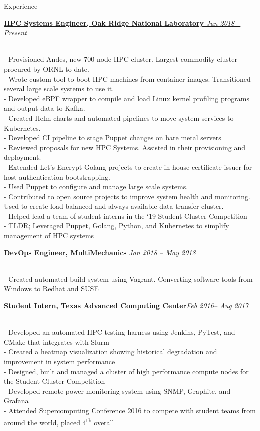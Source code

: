\documentclass{resume} %
\begin{document}
\begin{rSection}{Experience}

\href{http://olcf.ornl.gov}
{\textbf{HPC Systems Engineer, Oak Ridge National Laboratory}
  \hfill {\em Jun 2018 -- Present}}
  
\\- Provisioned Andes, new 700 node HPC cluster. Largest commodity cluster
    procured by ORNL to date.
\\- Wrote custom tool to boot HPC machines from container images. Transitioned
    several large scale systems to use it.
\\- Developed eBPF wrapper to compile and load Linux kernel profiling programs and
    output data to Kafka.
\\- Created Helm charts and automated pipelines to move system services to
    Kubernetes.
\\- Developed CI pipeline to stage Puppet changes on bare metal servers
\\- Reviewed proposals for new HPC Systems. Assisted in their provisioning and
    deployment.
\\- Extended Let's Encrypt Golang projects to create in-house certificate issuer for
    host authentication bootstrapping.
\\- Used Puppet to configure and manage large scale systems.
\\- Contributed to open source projects to improve system health and monitoring.
    Used to create load-balanced and always available data transfer cluster.
\\- Helped lead a team of student interns in the `19 Student Cluster Competition
\\- TLDR; Leveraged Puppet, Golang, Python, and Kubernetes to simplify
    management of HPC systems

\href{http://multimechanics.com}
{\textbf{DevOps Engineer, MultiMechanics}
  \hfill
  { \em Jan 2018 -- May 2018 }}
  
\\- Created automated build system using Vagrant. Converting software tools from
    Windows to Redhat and SUSE

\href{http://tacc.utexas.edu}
{\textbf{Student Intern, Texas Advanced Computing Center}}\hfill{\em Feb 2016-- Aug 2017}

\\- Developed an automated HPC testing harness using Jenkins, PyTest, and CMake that
    integrates with Slurm
\\- Created a heatmap visualization showing historical degradation and improvement in system performance
\\- Designed, built and managed a cluster of high performance compute nodes for the Student
    Cluster Competition
\\- Developed remote power monitoring system using SNMP, Graphite, and Grafana
\\- Attended Supercomputing Conference 2016 to compete with student teams from around the
    world, placed 4\textsuperscript{th} overall


\end{rSection}
\end{document}
